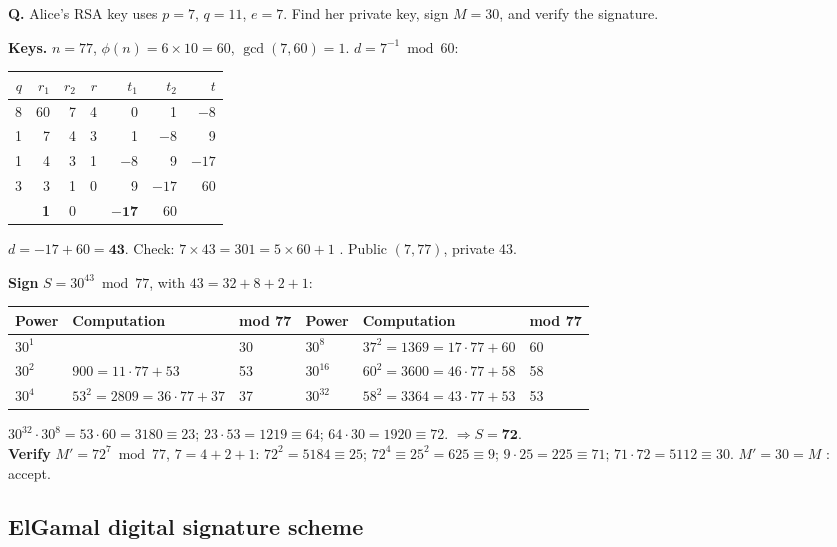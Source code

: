 \begin{worked}
\textbf{Q.} Alice's RSA key uses $p = 7$, $q = 11$, $e = 7$. Find her private key, sign $M = 30$, and verify the signature.

\textbf{Keys.} $n = 77$, $\phi(n) = 6 \times 10 = 60$, $\gcd(7, 60) = 1$. $d = 7^{-1} \bmod 60$:
\begin{center}\small
\begin{tabular}{@{}r|rrr|rrr@{}}
\toprule
$q$ & $r_1$ & $r_2$ & $r$ & $t_1$ & $t_2$ & $t$\\
\midrule
8 & 60 & 7 & 4 & 0 & 1 & $-8$\\
1 & 7 & 4 & 3 & 1 & $-8$ & 9\\
1 & 4 & 3 & 1 & $-8$ & 9 & $-17$\\
3 & 3 & 1 & 0 & 9 & $-17$ & 60\\
 & \textbf{1} & 0 & & $\mathbf{-17}$ & 60 & \\
\bottomrule
\end{tabular}
\end{center}
$d = -17 + 60 = \mathbf{43}$. Check: $7 \times 43 = 301 = 5 \times 60 + 1$ \checkmark. Public $(7, 77)$, private $43$.

\textbf{Sign} $S = 30^{43} \bmod 77$, with $43 = 32 + 8 + 2 + 1$:
\begin{center}\small
\begin{tabular}{@{}lll@{\qquad}lll@{}}
\toprule
Power & Computation & mod 77 & Power & Computation & mod 77\\
\midrule
$30^1$ & & 30 & $30^8$ & $37^2 = 1369 = 17 \cdot 77 + 60$ & 60\\
$30^2$ & $900 = 11 \cdot 77 + 53$ & 53 & $30^{16}$ & $60^2 = 3600 = 46 \cdot 77 + 58$ & 58\\
$30^4$ & $53^2 = 2809 = 36 \cdot 77 + 37$ & 37 & $30^{32}$ & $58^2 = 3364 = 43 \cdot 77 + 53$ & 53\\
\bottomrule
\end{tabular}
\end{center}
$30^{32} \cdot 30^8 = 53 \cdot 60 = 3180 \equiv 23$; \;$23 \cdot 53 = 1219 \equiv 64$; \;$64 \cdot 30 = 1920 \equiv 72$. \;$\Rightarrow S = \mathbf{72}$.\\
\textbf{Verify} $M' = 72^7 \bmod 77$, $7 = 4 + 2 + 1$: $72^2 = 5184 \equiv 25$; $72^4 \equiv 25^2 = 625 \equiv 9$; \;$9 \cdot 25 = 225 \equiv 71$; \;$71 \cdot 72 = 5112 \equiv 30$. $M' = 30 = M$ \checkmark: accept.
\end{worked}

\subsection{ElGamal digital signature scheme \hot}

